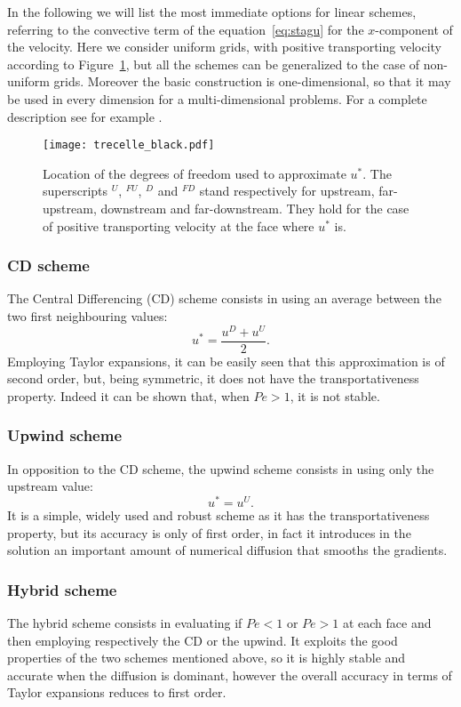 In the following we will list the most immediate options for linear schemes, 
referring to the 
convective term of the equation~\eqref{eq:stagu} for the $x$-component of the 
velocity. Here we consider uniform grids, with positive 
transporting velocity according to 
Figure~\ref{fig:superscripts}, but all the schemes can be generalized to the 
case of non-uniform grids. Moreover the basic construction is one-dimensional, 
so that it may be used in every dimension for a multi-dimensional problems. For 
a complete description see for example \cite{main:vermal}.
\begin{figure}
	\centering
	\texttt{[image: trecelle\_black.pdf]}
	\caption[Location of the degrees of freedom used to approximate 
	$u^*$]{Location of the degrees of freedom used to approximate $u^*$. The 
	superscripts $^U$, $^{FU}$, $^D$ and $^{FD}$ stand respectively for 
	upstream, far-upstream, downstream and far-downstream. They hold for the 
	case of positive transporting velocity at the face where $u^*$ is.}
	\label{fig:superscripts}
\end{figure}
\subsubsection{CD scheme}
The Central Differencing (CD) scheme consists in using an average between the 
two first neighbouring values:
\begin{equation} \label{eq:cd}
	u^* = \frac{u^D + u^U}{2}.
\end{equation}
Employing Taylor expansions, it can be easily seen that this approximation is 
of second order, but, being symmetric, it does not have the transportativeness 
property. Indeed it can be shown that, when $Pe > 1$, it is not stable.
%
\subsubsection{Upwind scheme}
In opposition to the CD scheme, the upwind scheme consists in using only the 
upstream value:
\begin{equation} \label{eq:upwind}
	u^* = u^U.
\end{equation}
It is a simple, widely used and robust scheme as it has the transportativeness 
property, but its accuracy is only of first order, in fact it introduces in the 
solution an important amount of numerical diffusion that smooths the gradients. 
%
\subsubsection{Hybrid scheme}
The hybrid scheme \cite{diff:hybrid} consists in evaluating if $Pe<1$ or 
$Pe>1$ at each face and then employing respectively the CD or the upwind. It 
exploits the good properties of the two schemes mentioned above, so it is 
highly stable and accurate when the diffusion is dominant, however the overall 
accuracy in terms of Taylor expansions reduces to first order.
%
